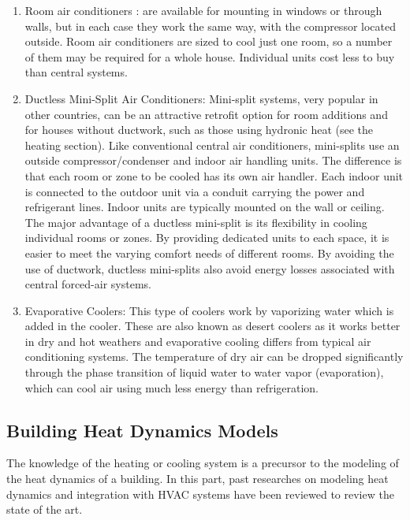 \documentclass{sig-alternate}
\begin{document}
\begin{enumerate}
\item Room air conditioners : are available for mounting in windows or through walls, but in each case they work the same way, with the compressor located outside. Room air conditioners are sized to cool just one room, so a number of them may be required for a whole house. Individual units cost less to buy than central systems.

\item Ductless Mini-Split Air Conditioners: Mini-split systems, very popular in other countries, can be an attractive retrofit option for room additions and for houses without ductwork, such as those using hydronic heat (see the heating section). Like conventional central air conditioners, mini-splits use an outside compressor/condenser and indoor air handling units. The difference is that each room or zone to be cooled has its own air handler. Each indoor unit is connected to the outdoor unit via a conduit carrying the power and refrigerant lines. Indoor units are typically mounted on the wall or ceiling. The major advantage of a ductless mini-split is its flexibility in cooling individual rooms or zones. By providing dedicated units to each space, it is easier to meet the varying comfort needs of different rooms. By avoiding the use of ductwork, ductless mini-splits also avoid energy losses associated with central forced-air systems. 

\item Evaporative Coolers: This type of coolers work by vaporizing water which is added in the cooler. These are also known as desert coolers as it works better in dry and hot weathers and evaporative cooling differs from typical air conditioning systems. The temperature of dry air can be dropped significantly through the phase transition of liquid water to water vapor (evaporation), which can cool air using much less energy than refrigeration.
\end{enumerate}
 

\subsection{Building Heat Dynamics Models} 

   The knowledge of the heating or cooling system is a precursor to the modeling of the heat dynamics of a building. In this part, past researches on modeling heat dynamics and integration with HVAC systems have been reviewed to review the state of the art. 
\end{document}
